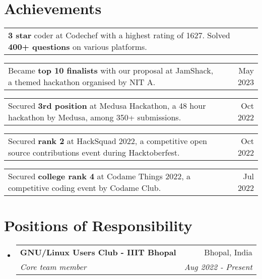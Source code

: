 \documentclass[a4paper,20pt]{article}
\makeatletter
\newcommand{\resumeSubheading}[4]{
  \vspace{-1pt}\item
    \begin{tabular*}{0.97\textwidth}{l@{\extracolsep{\fill}}r}
      \textbf{#1} & #2 \\
      \textit{#3} & \textit{#4} \\
    \end{tabular*}\vspace{-5pt}
}
\newcommand{\resumeSmallSubheading}[2]{
  \vspace{-1pt}\item
    \begin{tabular*}{0.97\textwidth}{l@{\extracolsep{\fill}}r}
      #1 & #2 \\
    \end{tabular*}\vspace{-8pt}
}
\newcommand{\resumeSubHeadingListStart}{\begin{itemize}[label={}, leftmargin=*]}
\newcommand{\resumeSubHeadingListEnd}{\end{itemize}}
\makeatother
\begin{document}
\vspace{-2pt}
\section{Achievements}
\begin{description}[font=$\bullet$]
  \resumeSmallSubheading{\textbf{3 star} coder at Codechef with a highest rating of 1627. Solved \textbf{400+ questions} on various platforms.}{}
  \vspace{-10pt}
  \resumeSmallSubheading{Became \textbf{top 10 finalists} with our proposal at JamShack, a themed hackathon organised by NIT A.}{May 2023}
  \vspace{-10pt}
  \resumeSmallSubheading{Secured \textbf{3rd position} at Medusa Hackathon, a 48 hour hackathon by Medusa, among 350+ submissions.}{Oct 2022}
  \vspace{-10pt}
  \resumeSmallSubheading{Secured \textbf{rank 2} at HackSquad 2022, a competitive open source contributions event during Hacktoberfest.} {Oct 2022}
  \vspace{-10pt}
  \resumeSmallSubheading{Secured \textbf{college rank 4} at Codame Things 2022, a competitive coding event by Codame Club.}{Jul 2022}
\end{description}

\vspace{-2pt}
\section{Positions of Responsibility}
\resumeSubHeadingListStart
    \resumeSubheading
    {GNU/Linux Users Club - IIIT Bhopal}{Bhopal, India}
    {Core team member}{Aug 2022 - Present}

\resumeSubHeadingListEnd

\vspace{-5pt}
\end{document}
